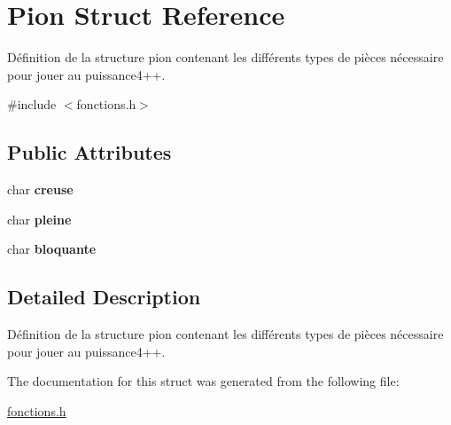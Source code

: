 \hypertarget{structPion}{\section{Pion Struct Reference}
\label{structPion}
}


Définition de la structure pion contenant les différents types de pièces nécessaire pour jouer au puissance4++.  




{\ttfamily \#include $<$fonctions.\-h$>$}

\subsection*{Public Attributes}
\begin{DoxyCompactItemize}
\item 
\hypertarget{structPion_a1885859aeb03f81e557b00bbe486b15a}{char {\bfseries creuse}}\label{structPion_a1885859aeb03f81e557b00bbe486b15a}

\item 
\hypertarget{structPion_a280a3c622b9a022b728fb307999c7ab1}{char {\bfseries pleine}}\label{structPion_a280a3c622b9a022b728fb307999c7ab1}

\item 
\hypertarget{structPion_a161c97144a2bdab7668606d46af55e8e}{char {\bfseries bloquante}}\label{structPion_a161c97144a2bdab7668606d46af55e8e}

\end{DoxyCompactItemize}


\subsection{Detailed Description}
Définition de la structure pion contenant les différents types de pièces nécessaire pour jouer au puissance4++. 

The documentation for this struct was generated from the following file\-:\begin{DoxyCompactItemize}
\item 
\hyperlink{fonctions_8h}{fonctions.\-h}\end{DoxyCompactItemize}
